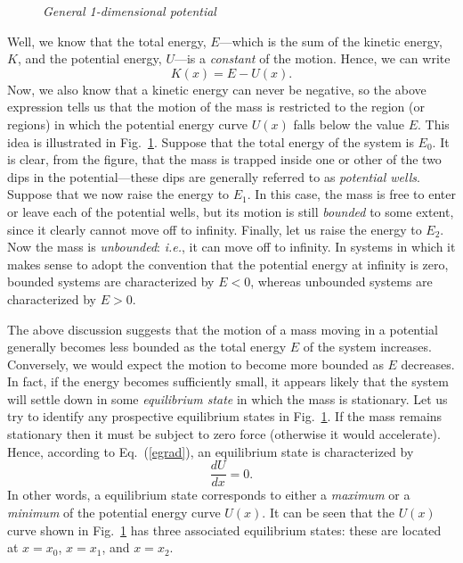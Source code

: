 \begin{figure}
\epsfysize=2.5in
\centerline{}
\caption{\em General 1-dimensional potential}\label{f43}   
\end{figure}

Well, we know that the total energy, $E$---which is the sum of the kinetic
energy, $K$, and the potential energy, $U$---is a {\em constant} of the motion.
Hence, we can write
\begin{equation}\label{e555}
K(x) = E - U(x).
\end{equation}
Now, we also know that a kinetic energy can never be negative, so the above
expression tells us that the motion of the mass is restricted to the
region (or regions) in which the potential energy curve $U(x)$ falls
below the value $E$. This idea is illustrated in Fig.~\ref{f43}.
Suppose that the total energy of the system is $E_0$. It is clear, from
the figure, that the mass is trapped inside one or other of the two dips
in the potential---these dips are
generally referred to as {\em potential wells}. 
Suppose that we now raise the energy to $E_1$. In this
case, the mass is free to enter or leave each of the potential wells, but
its motion is still {\em bounded} to some extent, since it clearly cannot move off to
infinity. Finally, let us raise the energy to $E_2$. Now the
mass is {\em unbounded}: {\em i.e.}, it can move off to infinity. In systems
in which it makes sense to adopt the convention that the potential
energy at infinity is zero, bounded systems are characterized
by $E<0$, whereas unbounded systems are characterized by  $E>0$. 

The above discussion suggests that the motion of a mass moving in a potential
generally becomes less bounded as the total energy $E$ of the system increases. 
Conversely, we would expect the motion to become more bounded as $E$ decreases.
In fact, if the energy becomes sufficiently small, it appears likely that the
system will settle down in some {\em equilibrium state} in which the mass is stationary.
Let us try  to identify any  prospective equilibrium states in Fig.~\ref{f43}.
If the mass remains stationary then it must be subject to zero force (otherwise
it would accelerate). Hence, according to Eq.~(\ref{egrad}), an equilibrium
state is characterized by
\begin{equation}
\frac{dU}{dx} = 0.
\end{equation}
In other words, a equilibrium state corresponds to either a {\em maximum}
or a {\em minimum} of the potential energy curve $U(x)$. It can
be seen that the $U(x)$ curve shown in Fig.~\ref{f43} has
three associated equilibrium states: these are located at
$x=x_0$, $x=x_1$, and $x=x_2$. 

